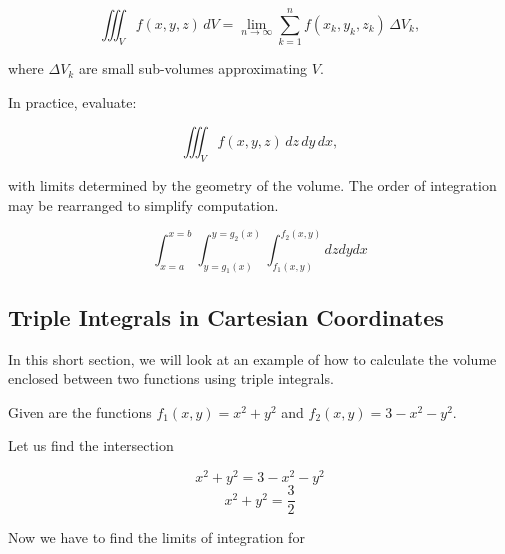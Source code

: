 \[
    \iiint_V f(x, y, z)\, dV = \lim_{n \to \infty} \sum_{k=1}^n f(x_k, y_k, z_k) \, \Delta V_k,
\]

where \( \Delta V_k \) are small sub-volumes approximating \( V \).

In practice, evaluate:

\[
    \iiint_V f(x, y, z)\, dz\, dy\, dx,
\]

with limits determined by the geometry of the volume. The order of integration may be rearranged to 
simplify computation.

\[
    \int_{x=a}^{x=b}\int_{y=g_1(x)}^{y=g_2(x)} \int_{f_1(x,y)}^{f_2(x,y)} dz dy dx
\]

\subsection{Triple Integrals in Cartesian Coordinates}

In this short section, we will look at an example of how to calculate the volume enclosed
between two functions using triple integrals.

Given are the functions \(f_1(x,y) = x^2 + y^2\) and \(f_2(x,y) = 3 - x^2 - y^2\).

\begin{center}
    
\end{center}

Let us find the intersection

\[
    x^2 + y^2 = 3 -x^2 - y^2 
\]
\[
    x^2 + y^2 = \frac{3}{2}
\]

Now we have to find the limits of integration for 

